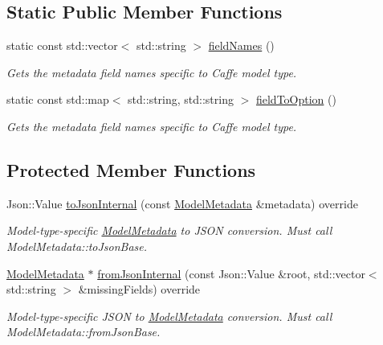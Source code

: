 \subsection*{Static Public Member Functions}
\begin{DoxyCompactItemize}
\item 
static const std\+::vector$<$ std\+::string $>$ \hyperlink{group___classification_module_gafcf3ba2ab411e7a7a232dcb4d8be8bcd}{field\+Names} ()
\begin{DoxyCompactList}\small\item\em Gets the metadata field names specific to Caffe model type. \end{DoxyCompactList}\item 
static const std\+::map$<$ std\+::string, std\+::string $>$ \hyperlink{group___classification_module_ga902389ddc019d347447a900ad76cf8f3}{field\+To\+Option} ()
\begin{DoxyCompactList}\small\item\em Gets the metadata field names specific to Caffe model type. \end{DoxyCompactList}\end{DoxyCompactItemize}
\subsection*{Protected Member Functions}
\begin{DoxyCompactItemize}
\item 
Json\+::\+Value \hyperlink{classdg_1_1deepcore_1_1classification_1_1_caffe_model_metadata_json_ab32a3ef2b1d3345b0c1bfedc12b04e87}{to\+Json\+Internal} (const \hyperlink{classdg_1_1deepcore_1_1classification_1_1_model_metadata}{Model\+Metadata} \&metadata) override
\begin{DoxyCompactList}\small\item\em Model-\/type-\/specific \hyperlink{classdg_1_1deepcore_1_1classification_1_1_model_metadata}{Model\+Metadata} to J\+S\+ON conversion. Must call Model\+Metadata\+::to\+Json\+Base. \end{DoxyCompactList}\item 
\hyperlink{classdg_1_1deepcore_1_1classification_1_1_model_metadata}{Model\+Metadata} $\ast$ \hyperlink{classdg_1_1deepcore_1_1classification_1_1_caffe_model_metadata_json_a1070ed25d3b4c95c83fab0896000fd44}{from\+Json\+Internal} (const Json\+::\+Value \&root, std\+::vector$<$ std\+::string $>$ \&missing\+Fields) override
\begin{DoxyCompactList}\small\item\em Model-\/type-\/specific J\+S\+ON to \hyperlink{classdg_1_1deepcore_1_1classification_1_1_model_metadata}{Model\+Metadata} conversion. Must call Model\+Metadata\+::from\+Json\+Base. \end{DoxyCompactList}\end{DoxyCompactItemize}


